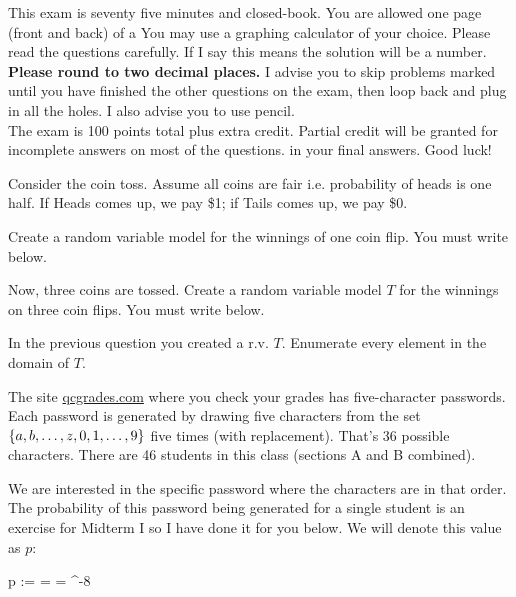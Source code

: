 \documentclass[12pt]{article}
\begin{document}
This exam is seventy five minutes and closed-book. You are allowed one page (front and back) of a  You may use a graphing calculator of your choice. Please read the questions carefully. If I say  this means the solution will be a number. \textbf{Please round to two decimal places.} I advise you to skip problems marked  until you have finished the other questions on the exam, then loop back and plug in all the holes. I also advise you to use pencil.\\

\noindent The exam is 100 points total plus extra credit. Partial credit will be granted for incomplete answers on most of the questions.  in your final answers. Good luck!

\pagebreak



\problem Consider the coin toss. Assume all coins are fair i.e. probability of heads is one half. If Heads comes up, we pay \$1; if Tails comes up, we pay \$0.

\benum

 Create a random variable model for the winnings of one coin flip. You must write  below. 

 Now, three coins are tossed. Create a random variable model $T$ for the winnings on three coin flips. You must write  below.

 In the previous question you created a r.v. $T$. Enumerate every element in the domain of $T$. 
\eenum

\problem The site \url{qcgrades.com} where you check your grades has five-character passwords. Each password is generated by drawing five characters from the set $\left\{a, b, \ldots, z, 0, 1, \ldots, 9\right\}$ five times (with replacement). That's 36 possible characters. There are 46 students in this class (sections A and B combined).

We are interested in the specific password  where the characters are in that order. The probability of this password being generated for a single student is an exercise for Midterm I so I have done it for you below. We will denote this value as $p$:

\beqn
p :=  =     =   ^{-8}
\eeqn
\end{document}
